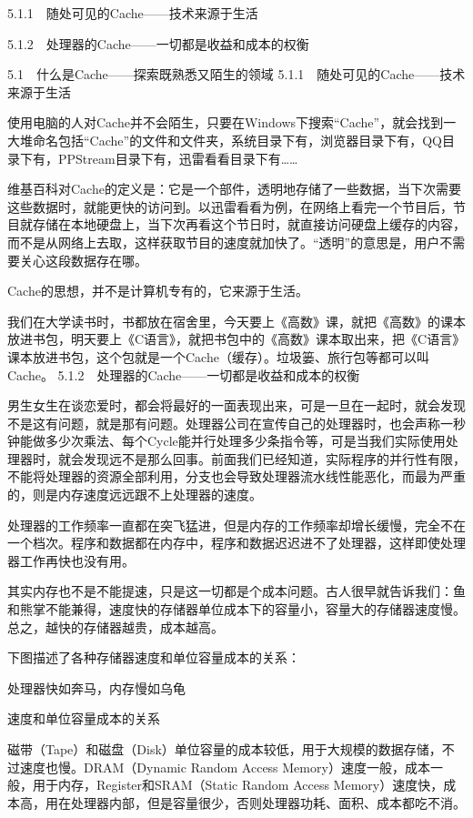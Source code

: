 \documentclass[12pt,UTF8]{ctexbook}
\begin{document}
5.1.1　随处可见的Cache——技术来源于生活

5.1.2　处理器的Cache——一切都是收益和成本的权衡


5.1　什么是Cache——探索既熟悉又陌生的领域
5.1.1　随处可见的Cache——技术来源于生活

使用电脑的人对Cache并不会陌生，只要在Windows下搜索“Cache”，就会找到一大堆命名包括“Cache”的文件和文件夹，系统目录下有，浏览器目录下有，QQ目录下有，PPStream目录下有，迅雷看看目录下有……

维基百科对Cache的定义是：它是一个部件，透明地存储了一些数据，当下次需要这些数据时，就能更快的访问到。以迅雷看看为例，在网络上看完一个节目后，节目就存储在本地硬盘上，当下次再看这个节日时，就直接访问硬盘上缓存的内容，而不是从网络上去取，这样获取节目的速度就加快了。“透明”的意思是，用户不需要关心这段数据存在哪。

Cache的思想，并不是计算机专有的，它来源于生活。

我们在大学读书时，书都放在宿舍里，今天要上《高数》课，就把《高数》的课本放进书包，明天要上《C语言》，就把书包中的《高数》课本取出来，把《C语言》课本放进书包，这个包就是一个Cache（缓存）。垃圾篓、旅行包等都可以叫Cache。
5.1.2　处理器的Cache——一切都是收益和成本的权衡

男生女生在谈恋爱时，都会将最好的一面表现出来，可是一旦在一起时，就会发现不是这有问题，就是那有问题。处理器公司在宣传自己的处理器时，也会声称一秒钟能做多少次乘法、每个Cycle能并行处理多少条指令等，可是当我们实际使用处理器时，就会发现远不是那么回事。前面我们已经知道，实际程序的并行性有限，不能将处理器的资源全部利用，分支也会导致处理器流水线性能恶化，而最为严重的，则是内存速度远远跟不上处理器的速度。

处理器的工作频率一直都在突飞猛进，但是内存的工作频率却增长缓慢，完全不在一个档次。程序和数据都在内存中，程序和数据迟迟进不了处理器，这样即使处理器工作再快也没有用。

其实内存也不是不能提速，只是这一切都是个成本问题。古人很早就告诉我们：鱼和熊掌不能兼得，速度快的存储器单位成本下的容量小，容量大的存储器速度慢。总之，越快的存储器越贵，成本越高。

下图描述了各种存储器速度和单位容量成本的关系：

处理器快如奔马，内存慢如乌龟

速度和单位容量成本的关系

磁带（Tape）和磁盘（Disk）单位容量的成本较低，用于大规模的数据存储，不过速度也慢。DRAM（Dynamic Random Access Memory）速度一般，成本一般，用于内存，Register和SRAM（Static Random Access Memory）速度快，成本高，用在处理器内部，但是容量很少，否则处理器功耗、面积、成本都吃不消。
\end{document}
